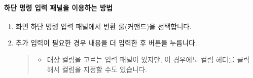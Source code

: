 \documentclass[letterpaper,10pt,english]{sphinxmanual}
\begin{document}
\paragraph{하단 명령 입력 패널을 이용하는 방법}
\label{\detokenize{discovery/part07/edit_rules:id4}}\begin{enumerate}
\def\theenumi{\arabic{enumi}}
\def\labelenumi{\theenumi .}
\makeatletter\def\p@enumii{\p@enumi \theenumi .}\makeatother
\item {} 
화면 하단 명령 입력 패널에서 변환 룰(커맨드)을 선택합니다.
\begin{quote}

\begin{figure}[H]
\centering

\noindent{}
\end{figure}
\end{quote}

\item {} 
추가 입력이 필요한 경우 내용을 더 입력한 후  버튼을 누릅니다.
\begin{quote}
\begin{itemize}
\item {} 
대상 컬럼을 고르는 입력 패널이 있지만, 이 경우에도 컬럼 헤더를 클릭해서 컬럼을 지정할 수도 있습니다.

\end{itemize}

\begin{figure}[H]
\centering

\noindent{}
\end{figure}
\end{quote}

\end{enumerate}
\end{document}

